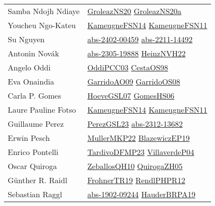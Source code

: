 {\begin{longtable}{p{4cm}p{20cm}}
Samba Ndojh Ndiaye & \href{papers/GroleazNS20.pdf}{GroleazNS20}\cite{GroleazNS20} \href{papers/GroleazNS20a.pdf}{GroleazNS20a}\cite{GroleazNS20a} \\
Youcheu Ngo{-}Kateu & \href{articles/KameugneFSN14.pdf}{KameugneFSN14}\cite{KameugneFSN14} \href{papers/KameugneFSN11.pdf}{KameugneFSN11}\cite{KameugneFSN11} \\
Su Nguyen & \href{articles/abs-2402-00459.pdf}{abs-2402-00459}\cite{abs-2402-00459} \href{articles/abs-2211-14492.pdf}{abs-2211-14492}\cite{abs-2211-14492} \\
Anton{\'{\i}}n Nov{\'{a}}k & \href{articles/abs-2305-19888.pdf}{abs-2305-19888}\cite{abs-2305-19888} \href{articles/HeinzNVH22.pdf}{HeinzNVH22}\cite{HeinzNVH22} \\
Angelo Oddi & \href{papers/OddiPCC03.pdf}{OddiPCC03}\cite{OddiPCC03} \href{papers/CestaOS98.pdf}{CestaOS98}\cite{CestaOS98} \\
Eva Onaindia & \href{articles/GarridoAO09.pdf}{GarridoAO09}\cite{GarridoAO09} \href{articles/GarridoOS08.pdf}{GarridoOS08}\cite{GarridoOS08} \\
Carla P. Gomes & \href{papers/HoeveGSL07.pdf}{HoeveGSL07}\cite{HoeveGSL07} \href{papers/GomesHS06.pdf}{GomesHS06}\cite{GomesHS06} \\
Laure Pauline Fotso & \href{articles/KameugneFSN14.pdf}{KameugneFSN14}\cite{KameugneFSN14} \href{papers/KameugneFSN11.pdf}{KameugneFSN11}\cite{KameugneFSN11} \\
Guillaume Perez & \href{papers/PerezGSL23.pdf}{PerezGSL23}\cite{PerezGSL23} \href{articles/abs-2312-13682.pdf}{abs-2312-13682}\cite{abs-2312-13682} \\
Erwin Pesch & \href{articles/MullerMKP22.pdf}{MullerMKP22}\cite{MullerMKP22} \href{}{BlazewiczEP19}\cite{BlazewiczEP19} \\
Enrico Pontelli & \href{papers/TardivoDFMP23.pdf}{TardivoDFMP23}\cite{TardivoDFMP23} \href{}{VillaverdeP04}\cite{VillaverdeP04} \\
Oscar Quiroga & \href{articles/ZeballosQH10.pdf}{ZeballosQH10}\cite{ZeballosQH10} \href{papers/QuirogaZH05.pdf}{QuirogaZH05}\cite{QuirogaZH05} \\
G{\"{u}}nther R. Raidl & \href{papers/FrohnerTR19.pdf}{FrohnerTR19}\cite{FrohnerTR19} \href{papers/RendlPHPR12.pdf}{RendlPHPR12}\cite{RendlPHPR12} \\
Sebastian Raggl & \href{articles/abs-1902-09244.pdf}{abs-1902-09244}\cite{abs-1902-09244} \href{articles/HauderBRPA19.pdf}{HauderBRPA19}\cite{HauderBRPA19} \\

\end{longtable}}
